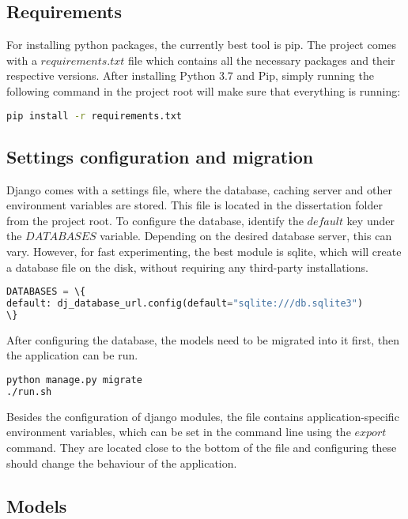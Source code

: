 \subsection{Requirements}
\label{subsec:app_install_requirements}

For installing python packages, the currently best tool is pip. The project comes with a $requirements.txt$ file which contains all the necessary packages and their respective versions. After installing Python 3.7 and Pip, simply running the following command in the project root will make sure that everything is running:

\begin{lstlisting}[language=Bash]
pip install -r requirements.txt
\end{lstlisting}

\subsection{Settings configuration and migration}
\label{subsec:app_install_database}

Django comes with a settings file, where the database, caching server and other environment variables are stored. This file is located in the dissertation folder from the project root. To configure the database, identify the $default$ key under the $DATABASES$ variable. Depending on the desired database server, this can vary. However, for fast experimenting, the best module is sqlite, which will create a database file on the disk, without requiring any third-party installations.

\begin{lstlisting}[language=Python]
DATABASES = \{
default: dj_database_url.config(default="sqlite:///db.sqlite3")
\}
\end{lstlisting}

After configuring the database, the models need to be migrated into it first, then the application can be run.

\begin{lstlisting}[language=Bash]
python manage.py migrate
./run.sh
\end{lstlisting}

Besides the configuration of django modules, the file contains application-specific environment variables, which can be set in the command line using the $export$ command. They are located close to the bottom of the file and configuring these should change the behaviour of the application.

\subsection{Models}
\label{subsec:app_install_models}

